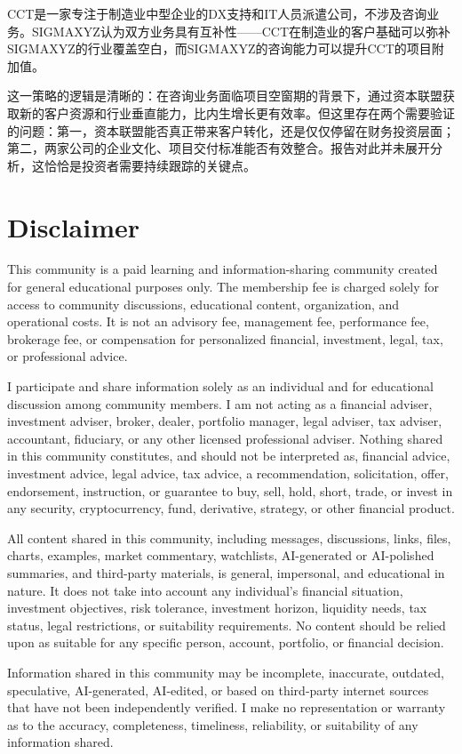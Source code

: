 \documentclass[11pt]{ctexart}
\begin{document}
CCT是一家专注于制造业中型企业的DX支持和IT人员派遣公司，不涉及咨询业务。SIGMAXYZ认为双方业务具有互补性——CCT在制造业的客户基础可以弥补SIGMAXYZ的行业覆盖空白，而SIGMAXYZ的咨询能力可以提升CCT的项目附加值。

这一策略的逻辑是清晰的：在咨询业务面临项目空窗期的背景下，通过资本联盟获取新的客户资源和行业垂直能力，比内生增长更有效率。但这里存在两个需要验证的问题：第一，资本联盟能否真正带来客户转化，还是仅仅停留在财务投资层面；第二，两家公司的企业文化、项目交付标准能否有效整合。报告对此并未展开分析，这恰恰是投资者需要持续跟踪的关键点。

\section{Disclaimer}
{\scriptsize\color{refgray}
This community is a paid learning and information-sharing community created for general educational purposes only. The membership fee is charged solely for access to community discussions, educational content, organization, and operational costs. It is not an advisory fee, management fee, performance fee, brokerage fee, or compensation for personalized financial, investment, legal, tax, or professional advice.\par
I participate and share information solely as an individual and for educational discussion among community members. I am not acting as a financial adviser, investment adviser, broker, dealer, portfolio manager, legal adviser, tax adviser, accountant, fiduciary, or any other licensed professional adviser. Nothing shared in this community constitutes, and should not be interpreted as, financial advice, investment advice, legal advice, tax advice, a recommendation, solicitation, offer, endorsement, instruction, or guarantee to buy, sell, hold, short, trade, or invest in any security, cryptocurrency, fund, derivative, strategy, or other financial product.\par
All content shared in this community, including messages, discussions, links, files, charts, examples, market commentary, watchlists, AI-generated or AI-polished summaries, and third-party materials, is general, impersonal, and educational in nature. It does not take into account any individual's financial situation, investment objectives, risk tolerance, investment horizon, liquidity needs, tax status, legal restrictions, or suitability requirements. No content should be relied upon as suitable for any specific person, account, portfolio, or financial decision.\par
Information shared in this community may be incomplete, inaccurate, outdated, speculative, AI-generated, AI-edited, or based on third-party internet sources that have not been independently verified. I make no representation or warranty as to the accuracy, completeness, timeliness, reliability, or suitability of any information shared.\par
}
\end{document}
